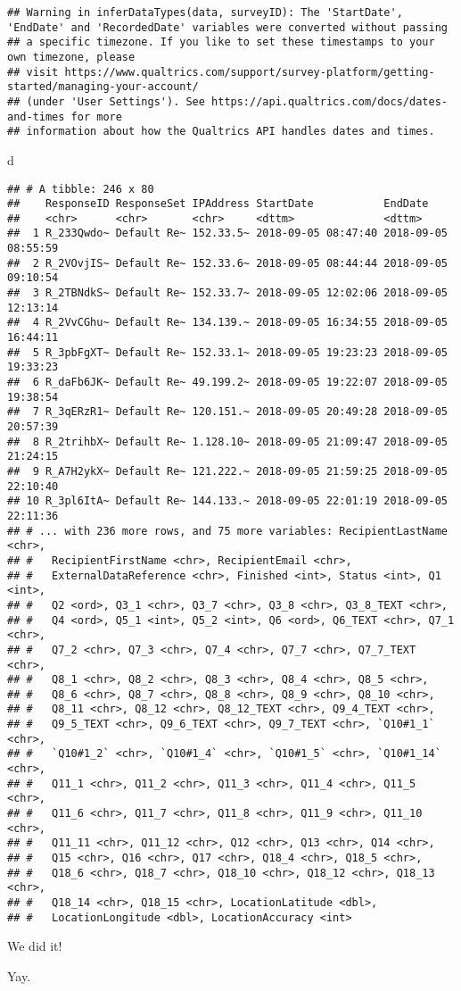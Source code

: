 \documentclass[]{article}
\newenvironment{Shaded}{\begin{snugshade}}{\end{snugshade}}
\newcommand{\NormalTok}[1]{#1}
\begin{document}
\begin{verbatim}
## Warning in inferDataTypes(data, surveyID): The 'StartDate', 'EndDate' and 'RecordedDate' variables were converted without passing
## a specific timezone. If you like to set these timestamps to your own timezone, please
## visit https://www.qualtrics.com/support/survey-platform/getting-started/managing-your-account/
## (under 'User Settings'). See https://api.qualtrics.com/docs/dates-and-times for more
## information about how the Qualtrics API handles dates and times.
\end{verbatim}

\begin{Shaded}
\begin{Highlighting}[]
\NormalTok{d}
\end{Highlighting}
\end{Shaded}

\begin{verbatim}
## # A tibble: 246 x 80
##    ResponseID ResponseSet IPAddress StartDate           EndDate            
##    <chr>      <chr>       <chr>     <dttm>              <dttm>             
##  1 R_233Qwdo~ Default Re~ 152.33.5~ 2018-09-05 08:47:40 2018-09-05 08:55:59
##  2 R_2VOvjIS~ Default Re~ 152.33.6~ 2018-09-05 08:44:44 2018-09-05 09:10:54
##  3 R_2TBNdkS~ Default Re~ 152.33.7~ 2018-09-05 12:02:06 2018-09-05 12:13:14
##  4 R_2VvCGhu~ Default Re~ 134.139.~ 2018-09-05 16:34:55 2018-09-05 16:44:11
##  5 R_3pbFgXT~ Default Re~ 152.33.1~ 2018-09-05 19:23:23 2018-09-05 19:33:23
##  6 R_daFb6JK~ Default Re~ 49.199.2~ 2018-09-05 19:22:07 2018-09-05 19:38:54
##  7 R_3qERzR1~ Default Re~ 120.151.~ 2018-09-05 20:49:28 2018-09-05 20:57:39
##  8 R_2trihbX~ Default Re~ 1.128.10~ 2018-09-05 21:09:47 2018-09-05 21:24:15
##  9 R_A7H2ykX~ Default Re~ 121.222.~ 2018-09-05 21:59:25 2018-09-05 22:10:40
## 10 R_3pl6ItA~ Default Re~ 144.133.~ 2018-09-05 22:01:19 2018-09-05 22:11:36
## # ... with 236 more rows, and 75 more variables: RecipientLastName <chr>,
## #   RecipientFirstName <chr>, RecipientEmail <chr>,
## #   ExternalDataReference <chr>, Finished <int>, Status <int>, Q1 <int>,
## #   Q2 <ord>, Q3_1 <chr>, Q3_7 <chr>, Q3_8 <chr>, Q3_8_TEXT <chr>,
## #   Q4 <ord>, Q5_1 <int>, Q5_2 <int>, Q6 <ord>, Q6_TEXT <chr>, Q7_1 <chr>,
## #   Q7_2 <chr>, Q7_3 <chr>, Q7_4 <chr>, Q7_7 <chr>, Q7_7_TEXT <chr>,
## #   Q8_1 <chr>, Q8_2 <chr>, Q8_3 <chr>, Q8_4 <chr>, Q8_5 <chr>,
## #   Q8_6 <chr>, Q8_7 <chr>, Q8_8 <chr>, Q8_9 <chr>, Q8_10 <chr>,
## #   Q8_11 <chr>, Q8_12 <chr>, Q8_12_TEXT <chr>, Q9_4_TEXT <chr>,
## #   Q9_5_TEXT <chr>, Q9_6_TEXT <chr>, Q9_7_TEXT <chr>, `Q10#1_1` <chr>,
## #   `Q10#1_2` <chr>, `Q10#1_4` <chr>, `Q10#1_5` <chr>, `Q10#1_14` <chr>,
## #   Q11_1 <chr>, Q11_2 <chr>, Q11_3 <chr>, Q11_4 <chr>, Q11_5 <chr>,
## #   Q11_6 <chr>, Q11_7 <chr>, Q11_8 <chr>, Q11_9 <chr>, Q11_10 <chr>,
## #   Q11_11 <chr>, Q11_12 <chr>, Q12 <chr>, Q13 <chr>, Q14 <chr>,
## #   Q15 <chr>, Q16 <chr>, Q17 <chr>, Q18_4 <chr>, Q18_5 <chr>,
## #   Q18_6 <chr>, Q18_7 <chr>, Q18_10 <chr>, Q18_12 <chr>, Q18_13 <chr>,
## #   Q18_14 <chr>, Q18_15 <chr>, LocationLatitude <dbl>,
## #   LocationLongitude <dbl>, LocationAccuracy <int>
\end{verbatim}

We did it!

Yay.
\end{document}
